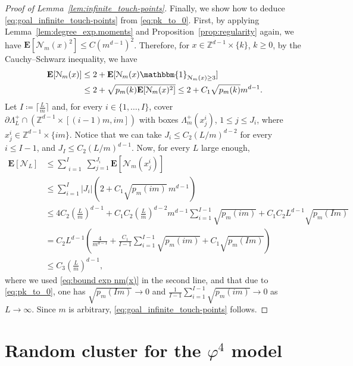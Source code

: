 \documentclass[11pt,a4paper]{article}
\theoremstyle{definition}
\numberwithin{equation}{section}
\begin{document}
\begin{proof}[Proof of Lemma~\textup{\ref{lem:infinite_touch-points}}]
Finally, we show how to deduce \eqref{eq:goal_infinite_touch-points} from \eqref{eq:pk_to_0}. First, by applying Lemma~\ref{lem:degree_exp.moments} and Proposition~\ref{prop:regularity} again, we have $\mathbf{E}[\mathcal{N}_m(x)^2]\leq C(m^{d-1})^2$. Therefore, for $x\in \mathbb{Z}^{d-1}\times \{k\}$, $k\geq0$, by the Cauchy--Schwarz inequality, we have
\begin{align} 
\mathbf{E}[\mathcal{N}_m(x)]&\leq 2 + \mathbf{E}[\mathcal{N}_m(x) \mathbbm{1}_{\mathcal{N}_m(x)\geq3}] 
\notag\\&
\leq 2+\sqrt{p_m(k)\mathbf{E}[\mathcal{N}_m(x)^2]}
\leq 2+C_1\sqrt{p_m(k)} m^{d-1}.\label{eq:bound exp nm(x)}
\end{align}
Let $I\coloneqq \lceil \frac{L}{m} \rceil$ and, for every $i \in \{1,\dots, I \}$, cover $\partial \Lambda^+_L \cap (\mathbb{Z}^{d-1}\times [(i-1)m, im])$ with boxes $\Lambda^+_m(x^i_j)$, $1\leq j\leq J_i$, where $x^i_j\in \mathbb{Z}^{d-1}\times \{im\}$. Notice that we can take $J_i\leq C_2 (L/m)^{d-2}$ for every $i\leq I-1$, and $J_I\leq C_2 (L/m)^{d-1}$. Now, for every $L$ large enough,
\begin{align*} 
\mathbf{E}[\mathcal{N}_L] &\leq \sum_{\substack{i=1}}^I\sum_{j=1}^{J_i} \mathbf{E}[\mathcal{N}_m(x^i_j)]
\\&
\leq \sum_{i=1}^{I} |J_i| \left( 2+ C_1\sqrt{p_m(im)}\, m^{d-1}\right) \\
&\leq 4C_2 \left(\frac{L}{m}\right)^{d-1}+ C_1C_2\left(\frac{L}{m}\right)^{d-2}m^{d-1} \sum_{i=1}^{I-1}\sqrt{p_m(im)}+C_1C_2 L^{d-1}\sqrt{p_m(Im)}\\&= C_2L^{d-1} \left( \frac{4}{m^{d-1}} + \frac{C_1}{I-1} \sum_{i=1}^{I-1} \sqrt{p_m(im)}+C_1\sqrt{p_m(Im)}  \right)
\\&
\leq C_3 \left(\frac{L}{m}\right)^{d-1},
\end{align*}
where we used \eqref{eq:bound exp nm(x)} in the second line, and that due to \eqref{eq:pk_to_0}, one has $\sqrt{p_m(Im)}\to 0$ and $\frac{1}{I-1} \sum_{i=1}^{I-1} \sqrt{p_m(im)}\to 0$ as $L\to\infty$.
Since $m$ is arbitrary, \eqref{eq:goal_infinite_touch-points} follows.
\end{proof}




\section{Random cluster for the $\varphi^4$ model}\label{sec:random_cluster}
\end{document}
